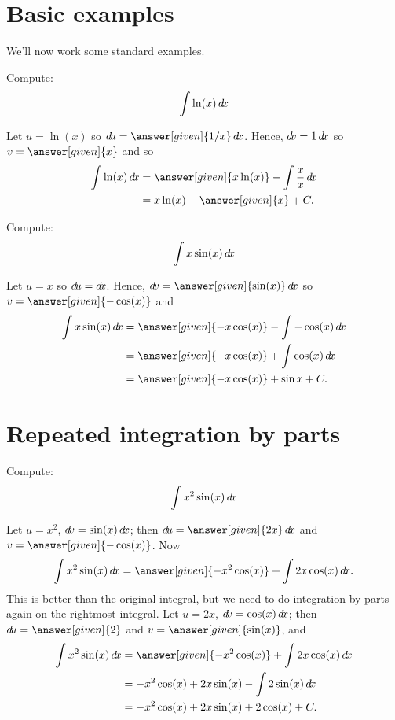 \documentclass{ximera}
\begin{document}
\section{Basic examples}


We'll now work some standard examples.


\begin{example}
Compute:
\[
\int \ln(x)\mathop{}\!d\! x
\]
\begin{explanation}
Let $u=\ln(x)$ so $\d u=\answer[given]{1/x}\d x$. Hence,  $\mathop{}\!d\! v=1\mathop{}\!d\! x$ so $v=\answer[given]{x}$
and so 
\begin{align*}
 \int \ln(x)\d x&=\answer[given]{x \ln(x)}-\int \frac{x}{x}\d x\\
&= x\ln (x)- \answer[given]{x}+C.\\
\end{align*}
\end{explanation}
\end{example}


\begin{example}
Compute:
\[
\int x\sin(x) \mathop{}\!d\! x
\]
\begin{explanation} Let $u=x$ so $\mathop{}\!d\! u=\mathop{}\!d\! x$. Hence, $\d v=\answer[given]{\sin(x)}\d x$ so $v=\answer[given]{-\cos(x)}$ and
\begin{align*}
\int x\sin(x)\d x &=\answer[given]{-x\cos(x)}-\int -\cos(x)\d x\\
&= \answer[given]{-x\cos(x)}+\int \cos(x)\d x\\
&=\answer[given]{-x\cos(x)}+\sin x+C.
\end{align*}
\end{explanation}
\end{example}



\section{Repeated integration by parts}


\begin{example}
Compute:
\[
\int x^2\sin(x)\mathop{}\!d\! x
\] 
\begin{explanation}
Let $u=x^2$, $\mathop{}\!d\! v=\sin(x)\mathop{}\!d\! x$; then $\d u=\answer[given]{2x}\d x$ and $v=\answer[given]{-\cos(x)}$. 
Now 
\[
\int x^2\sin(x)\d x=\answer[given]{-x^2\cos(x)}+\int 2x\cos(x)\d x.
\] 
This is better than the original integral, but we need to do
integration by parts again on the rightmost integral. Let $u=2x$, $\mathop{}\!d\! v=\cos(x)\mathop{}\!d\! x$; then $\d u=\answer[given]{2}$
and $v=\answer[given]{\sin(x)}$, and
\begin{align*}
  \int x^2\sin(x)\d x &=\answer[given]{-x^2\cos(x)}+\int 2x\cos(x)\d x \\
  &=-x^2\cos(x)+ 2x\sin(x) - \int 2\sin(x)\d x \\
  &=-x^2\cos(x)+ 2x\sin(x) + 2\cos(x) + C. 
\end{align*}
\end{explanation}
\end{example}
\end{document}
